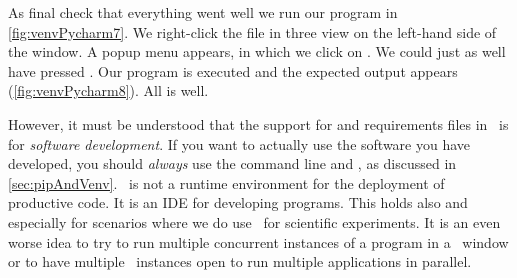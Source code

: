 As final check that everything went well we run our program  in \cref{fig:venvPycharm7}.
We right-click the file in three view on the left-hand side of the window.
A popup menu appears, in which we click on .
We could just as well have pressed .
Our program is executed and the expected output appears (\cref{fig:venvPycharm8}).
All is well.

However, it must be understood that the support for  and requirements files in \pycharm\ is for \emph{software development}.
If you want to actually use the software you have developed, you should \emph{always} use the command line and , as discussed in \cref{sec:pipAndVenv}.
\pycharm\ is not a runtime environment for the deployment of productive code.
It is an \acrfull{IDE} for developing programs.%
%
%
%
This holds also and especially for scenarios where we do use \python\ for scientific experiments.
It is an even worse idea to try to run multiple concurrent instances of a program in a \pycharm\ window or to have multiple \pycharm\ instances open to run multiple applications in parallel.%
%
\FloatBarrier%
\endhsection%
%
